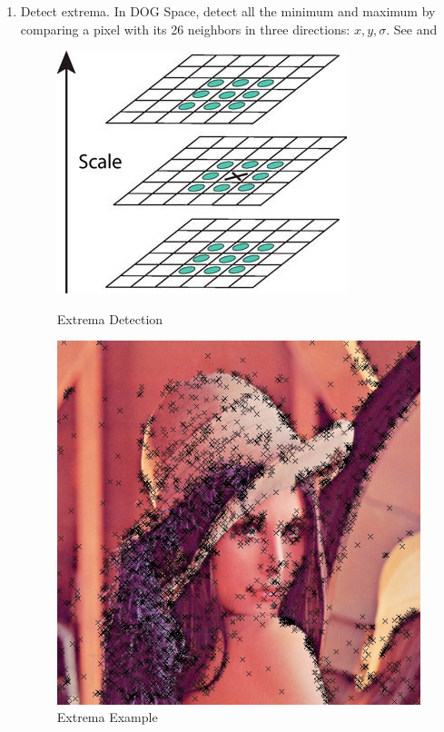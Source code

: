 \begin{enumerate}
  \item Detect extrema. In DOG Space, detect all the minimum and maximum
    by comparing a pixel with its 26 neighbors in three directions: $ x, y, \sigma$.
    See  and 
    \begin{figure}[H]
      \begin{minipage}[b]{0.46\linewidth}
        \centering
        \includegraphics[scale=0.4]{res/extrema.png}
        \caption{Extrema Detection\label{fig:extrema}}
      \end{minipage}
      \hspace{1em}
      \begin{minipage}[b]{0.46\linewidth}
        \centering
        \includegraphics[scale=0.35]{res/extrema_lenna.png}
        \caption{Extrema Example\label{fig:extrema2}}
      \end{minipage}
    \end{figure}


\end{enumerate}
